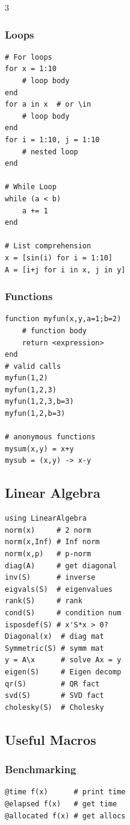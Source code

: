 \begin{multicols*}{3}
\subsubsection{Loops}
\vspace*{-2mm}
\begin{verbatim}
# For loops
for x = 1:10
    # loop body
end
for a in x  # or \in
    # loop body
end
for i = 1:10, j = 1:10
    # nested loop
end

# While Loop
while (a < b)
    a += 1
end

# List comprehension
x = [sin(i) for i = 1:10]
A = [i+j for i in x, j in y]
\end{verbatim}

\subsubsection{Functions}
\vspace*{-2mm}
\begin{verbatim}
function myfun(x,y,a=1;b=2)
    # function body
    return <expression>
end
# valid calls
myfun(1,2)
myfun(1,2,3)
myfun(1,2,3,b=3)
myfun(1,2,b=3)

# anonymous functions
mysum(x,y) = x+y
mysub = (x,y) -> x-y
\end{verbatim}


\subsection{Linear Algebra}
\vspace*{-2mm}
\begin{verbatim}
using LinearAlgebra
norm(x)     # 2 norm
norm(x,Inf) # Inf norm
norm(x,p)   # p-norm
diag(A)     # get diagonal
inv(S)      # inverse
eigvals(S)  # eigenvalues
rank(S)     # rank
cond(S)     # condition num 
isposdef(S) # x'S*x > 0?
Diagonal(x)  # diag mat
Symmetric(S) # symm mat
y = A\x      # solve Ax = y
eigen(S)     # Eigen decomp 
qr(S)        # QR fact
svd(S)       # SVD fact
cholesky(S)  # Cholesky
\end{verbatim}

\subsection{Useful Macros}
\subsubsection{Benchmarking}
\vspace*{-2mm}
\begin{verbatim}
@time f(x)      # print time
@elapsed f(x)   # get time
@allocated f(x) # get allocs


\end{verbatim}
\end{multicols*}
